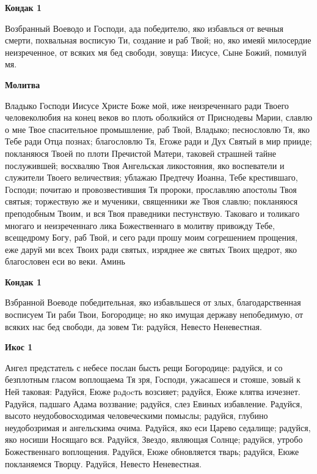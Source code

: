 \medskip


\bfseries Кондак 1\normalfont{}


Возбранный Воеводо и Господи, ада победителю, яко избавлься от вечныя смерти, похвальная восписую Ти, создание и раб Твой; но, яко имеяй милосердие неизреченное, от всяких мя бед свободи, зовуща: Иисусе, Сыне Божий, помилуй мя.


\medskip


\bfseries Молитва\normalfont{}


Владыко Господи Иисусе Христе Боже мой, иже неизреченнаго ради Твоего человеколюбия на конец веков во плоть оболкийся от Приснодевы Марии, славлю о мне Твое спасительное промышление, раб Твой, Владыко; песнословлю Тя, яко Тебе ради Отца познах; благословлю Тя, Егоже ради и Дух Святый в мир прииде; покланяюся Твоей по плоти Пречистой Матери, таковей страшней тайне послужившей; восхваляю Твоя Ангельская ликостояния, яко воспеватели и служители Твоего величествия; ублажаю Предтечу Иоанна, Тебе крестившаго, Господи; почитаю и провозвестившия Тя пророки, прославляю апостолы Твоя святыя; торжествую же и мученики, священники же Твоя славлю; покланяюся преподобным Твоим, и вся Твоя праведники пестунствую. Таковаго и толикаго многаго и неизреченнаго лика Божественнаго в молитву привожду Тебе, всещедрому Богу, раб Твой, и сего ради прошу моим согрешением прощения, еже даруй ми всех Твоих ради святых, изряднее же святых Твоих щедрот, яко благословен еси во веки. Аминь


\mychapterending





\bfseries Кондак 1\normalfont{}

Взбранной Воеводе победительная, яко избавльшеся от злых, благодарственная восписуем Ти раби Твои, Богородице; но яко имущая державу непобедимую, от всяких нас бед свободи, да зовем Ти: радуйся, Невесто Неневестная.


\bfseries Икос 1\normalfont{}

Ангел предстатель с небесе послан бысть рещи Богородице: радуйся, и со безплотным гласом воплощаема Тя зря, Господи, ужасашеся и стояше, зовый к Ней таковая: Радуйся, Еюже рaдocть возсияет; радуйся, Еюже клятва изчезнет. Радуйся, падшаго Адама воззвание; радуйся, слез Евиных избавление. Радуйся, высото неудобовосходимая человеческими помыслы; радуйся, глубино неудобозримая и ангельскима очима. Радуйся, яко еси Царево седалище; радуйся, яко носиши Носящаго вся. Радуйся, Звездо, являющая Солнце; радуйся, утробо Божественнаго воплощения. Радуйся, Еюже обновляется тварь; радуйся, Еюже покланяемся Творцу. Радуйся, Невесто Неневестная.


